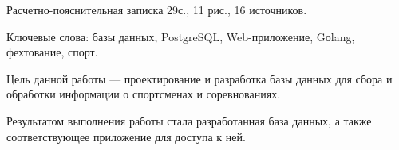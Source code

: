 
Расчетно-пояснительная записка 29с., 11 рис., 16 источников.

Ключевые слова: базы данных, PostgreSQL, Web-приложение, Gоlang, фехтование, спорт.

Цель данной работы --- проектирование и разработка базы данных для сбора и обработки информации о спортсменах и соревнованиях.

Результатом выполнения работы стала разработанная база данных, а также соответствующее приложение для доступа к ней.